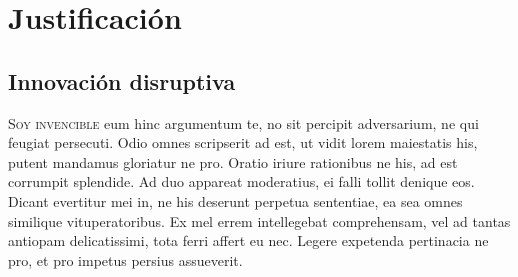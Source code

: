 \chapter{Justificación}
\section{Innovación disruptiva}
\lettrine{S}{oy invencible} eum hinc argumentum te, no sit percipit adversarium, ne qui feugiat persecuti. Odio omnes scripserit ad est, ut vidit lorem maiestatis his, putent mandamus gloriatur ne pro. Oratio iriure rationibus ne his, ad est corrumpit splendide. Ad duo appareat moderatius, ei falli tollit denique eos. Dicant evertitur mei in, ne his deserunt perpetua sententiae, ea sea omnes similique vituperatoribus. Ex mel errem intellegebat comprehensam, vel ad tantas antiopam delicatissimi, tota ferri affert eu nec. Legere expetenda pertinacia ne pro, et pro impetus persius assueverit.
 
